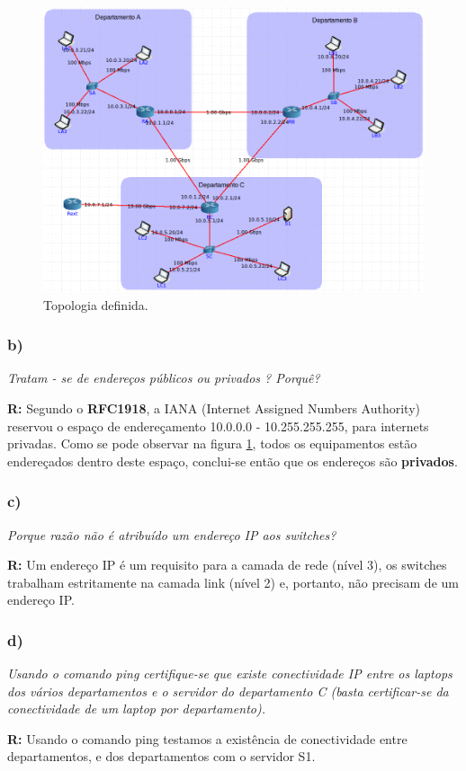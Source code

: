 \documentclass{llncs}
\begin{document}
\begin{figure}[H]
\begin{center}
\includegraphics[scale=0.25]{1_a.png} 
\end{center}
\caption{\label{fig:1_a} Topologia definida.}
\end{figure} 

\subsubsection{b)}
\emph{Tratam
-
se de endereços públicos ou privados
?
Porquê?}
\\ \par
\textbf{R:} Segundo o \textbf{RFC1918}, a IANA (Internet Assigned Numbers Authority) reservou o espaço de endereçamento 10.0.0.0 - 10.255.255.255, para internets privadas. Como se pode observar na figura \ref{fig:1_a}, todos os equipamentos estão endereçados dentro deste espaço, conclui-se então que os endereços são \textbf{privados}.

\subsubsection{c)}
\emph{Porque razão não é atribuído um endereço IP aos 
switches?}
\\ \par
\textbf{R:} Um endereço IP é um requisito para a camada de rede (nível 3), os switches trabalham estritamente na camada link (nível 2) e, portanto, não precisam de um endereço IP.

\subsubsection{d)}
\emph{Usando o comando 
ping
certifique-se que existe conectividade 
IP
entre
os 
laptops
dos vários  departamentos e o servidor do  departamento  C (basta certificar-se da conectividade de um laptop por departamento).}
\\ \par
\textbf{R:} Usando o comando ping testamos a existência de conectividade entre departamentos, e dos departamentos com o servidor S1.
\end{document}
